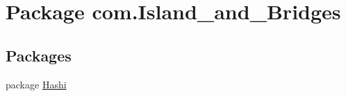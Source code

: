 \hypertarget{namespacecom_1_1_island__and___bridges}{}\section{Package com.\+Island\+\_\+and\+\_\+\+Bridges}
\label{namespacecom_1_1_island__and___bridges}
\subsection*{Packages}
\begin{DoxyCompactItemize}
\item 
package \mbox{\hyperlink{namespacecom_1_1_island__and___bridges_1_1_hashi}{Hashi}}
\end{DoxyCompactItemize}
